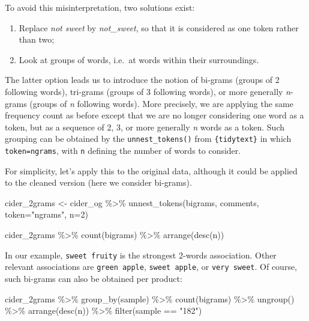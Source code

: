 \documentclass[
]{book}
\newenvironment{Shaded}{\begin{snugshade}}{\end{snugshade}}
\newcommand{\AttributeTok}[1]{\textcolor[rgb]{0.77,0.63,0.00}{#1}}
\newcommand{\DecValTok}[1]{\textcolor[rgb]{0.00,0.00,0.81}{#1}}
\newcommand{\FunctionTok}[1]{\textcolor[rgb]{0.00,0.00,0.00}{#1}}
\newcommand{\NormalTok}[1]{#1}
\newcommand{\OtherTok}[1]{\textcolor[rgb]{0.56,0.35,0.01}{#1}}
\newcommand{\SpecialCharTok}[1]{\textcolor[rgb]{0.00,0.00,0.00}{#1}}
\newcommand{\StringTok}[1]{\textcolor[rgb]{0.31,0.60,0.02}{#1}}
\providecommand{\tightlist}{%
  \setlength{\itemsep}{0pt}\setlength{\parskip}{0pt}}
\begin{document}
To avoid this misinterpretation, two solutions exist:

\begin{enumerate}
\def\labelenumi{\arabic{enumi}.}
\tightlist
\item
  Replace \emph{not sweet} by \emph{not\_sweet}, so that it is considered as one token rather than two;
\item
  Look at groups of words, i.e.~at words within their surroundings.
\end{enumerate}

The latter option leads us to introduce the notion of bi-grams (groups of 2 following words), tri-grams (groups of 3 following words), or more generally \emph{n}-grams (groups of \emph{n} following words). More precisely, we are applying the same frequency count as before except that we are no longer considering one word as a token, but as a sequence of 2, 3, or more generally \emph{n} words as a token. Such grouping can be obtained by the \texttt{unnest\_tokens()} from \texttt{\{tidytext\}} in which \texttt{token=\textquotesingle{}ngrams\textquotesingle{}}, with \texttt{n} defining the number of words to consider.

For simplicity, let's apply this to the original data, although it could be applied to the cleaned version (here we consider bi-grams).

\begin{Shaded}
\begin{Highlighting}[]
\NormalTok{cider\_2grams }\OtherTok{\textless{}{-}}\NormalTok{ cider\_og }\SpecialCharTok{\%\textgreater{}\%} 
  \FunctionTok{unnest\_tokens}\NormalTok{(bigrams, comments, }\AttributeTok{token=}\StringTok{"ngrams"}\NormalTok{, }\AttributeTok{n=}\DecValTok{2}\NormalTok{)}

\NormalTok{cider\_2grams }\SpecialCharTok{\%\textgreater{}\%} 
  \FunctionTok{count}\NormalTok{(bigrams) }\SpecialCharTok{\%\textgreater{}\%} 
  \FunctionTok{arrange}\NormalTok{(}\FunctionTok{desc}\NormalTok{(n))}
\end{Highlighting}
\end{Shaded}

In our example, \texttt{sweet\ fruity} is the strongest 2-words association. Other relevant associations are \texttt{green\ apple}, \texttt{sweet\ apple}, or \texttt{very\ sweet}.
Of course, such bi-grams can also be obtained per product:

\begin{Shaded}
\begin{Highlighting}[]
\NormalTok{cider\_2grams }\SpecialCharTok{\%\textgreater{}\%} 
  \FunctionTok{group\_by}\NormalTok{(sample) }\SpecialCharTok{\%\textgreater{}\%} 
  \FunctionTok{count}\NormalTok{(bigrams) }\SpecialCharTok{\%\textgreater{}\%} 
  \FunctionTok{ungroup}\NormalTok{() }\SpecialCharTok{\%\textgreater{}\%} 
  \FunctionTok{arrange}\NormalTok{(}\FunctionTok{desc}\NormalTok{(n)) }\SpecialCharTok{\%\textgreater{}\%} 
  \FunctionTok{filter}\NormalTok{(sample }\SpecialCharTok{==} \StringTok{"182"}\NormalTok{)}
\end{Highlighting}
\end{Shaded}
\end{document}
